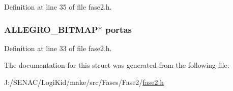 Definition at line 35 of file fase2.\-h.

\hypertarget{struct_level_dois_a6c47128335a6e9846fb9576bace5a597}{
\subsubsection[{portas}]{\setlength{\rightskip}{0pt plus 5cm}A\-L\-L\-E\-G\-R\-O\-\_\-\-B\-I\-T\-M\-A\-P$\ast$ portas}}\label{struct_level_dois_a6c47128335a6e9846fb9576bace5a597}


Definition at line 33 of file fase2.\-h.



The documentation for this struct was generated from the following file\-:\begin{DoxyCompactItemize}
\item 
J\-:/\-S\-E\-N\-A\-C/\-Logi\-Kid/make/src/\-Fases/\-Fase2/\hyperlink{fase2_8h}{fase2.\-h}\end{DoxyCompactItemize}
